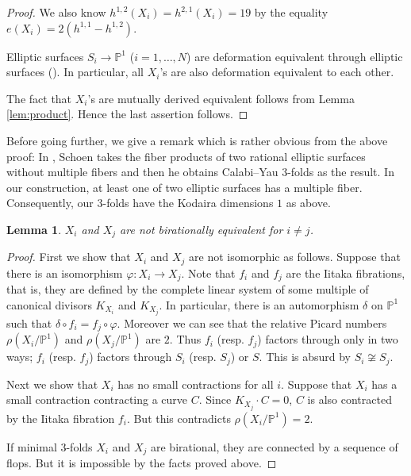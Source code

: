 \documentclass[a4paper,11pt]{article}
\newtheorem{lem}[thm]{Lemma}
\theoremstyle{definition}\newtheorem{defn}[thm]{Definition}
\theoremstyle{remark}\newtheorem{remark}[thm]{Remark}
\numberwithin{equation}{section}
\newcommand{\PP}{\mathbb P}
\begin{document}
\begin{proof}
We also know $h^{1,2}(X_i)=h^{2,1}(X_i)=19$ 
by the equality $e(X_i)=2(h^{1,1}-h^{1,2})$.
  

Elliptic surfaces $S_i\to \PP^1$ ($i=1,\ldots, N$) are 
deformation equivalent through elliptic surfaces
(\cite[Theorem 1.7.6]{FM94}). In particular, all $X_i$'s are also 
deformation equivalent to each other.
 
 The fact that $X_i$'s are mutually derived equivalent follows from  
 Lemma \ref{lem:product}.
 Hence the last assertion follows.
\end{proof}

Before going further, we give a remark which is rather obvious from the above proof:  
In \cite{Sc88}, Schoen takes the fiber products of 
two rational  elliptic surfaces 
without multiple fibers and then
he obtains Calabi--Yau $3$-folds as the result.
In our construction,  
at least one of two elliptic surfaces has a 
multiple fiber. Consequently,
our $3$-folds have the Kodaira dimensions $1$ as above.


\begin{lem}\label{lem:birational}
$X_i$ and $X_j$ are not birationally equivalent for $i\ne j$.
\end{lem}

\begin{proof}
First we show that $X_i$ and $X_j$ are not isomorphic as follows.
Suppose that there is an isomorphism $\varphi\colon X_i\to X_j$.
Note that $f_i$ and $f_j$ are the Iitaka fibrations, that is,
they are defined by the complete linear system of some multiple 
of canonical divisors $K_{X_i}$ and $K_{X_j}$. In particular, 
there is an automorphism $\delta$ on $\PP^1$ such that 
$\delta\circ f_i=f_j\circ \varphi$.
Moreover we can see that the relative Picard numbers 
$\rho(X_i/\PP ^1)$ and $\rho (X_j/\PP ^1)$ are $2$. 
Thus $f_i$ (resp. $f_j$) factors through only in two ways;
$f_i$ (resp. $f_j$) factors through $S_i$ (resp. $S_j$) or $S$.
This is absurd by $S_i\not\cong S_j$.  

Next we show that $X_i$ has no small contractions for all $i$.
Suppose that $X_i$ has a small contraction contracting a 
curve $C$. Since $K_{X_j}\cdot C=0$, $C$ is also contracted by 
the Iitaka fibration $f_i$. But this contradicts $\rho (X_i/\PP ^1)=2$.

If minimal 3-folds $X_i$ and $X_j$ are birational, 
they are connected by a sequence of flops.
But it is impossible by the facts proved above.

\end{proof}
\end{document}
